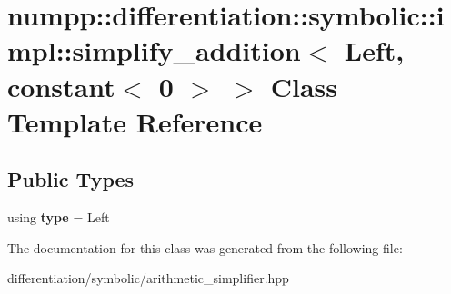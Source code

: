 \hypertarget{classnumpp_1_1differentiation_1_1symbolic_1_1impl_1_1simplify__addition_3_01Left_00_01constant_3_010_01_4_01_4}{}\section{numpp\+:\+:differentiation\+:\+:symbolic\+:\+:impl\+:\+:simplify\+\_\+addition$<$ Left, constant$<$ 0 $>$ $>$ Class Template Reference}
\label{classnumpp_1_1differentiation_1_1symbolic_1_1impl_1_1simplify__addition_3_01Left_00_01constant_3_010_01_4_01_4}
\subsection*{Public Types}
\begin{DoxyCompactItemize}
\item 
\mbox{\label{classnumpp_1_1differentiation_1_1symbolic_1_1impl_1_1simplify__addition_3_01Left_00_01constant_3_010_01_4_01_4_a088c52e65597589bcababd58c815417f}} 
using {\bfseries type} = Left
\end{DoxyCompactItemize}


The documentation for this class was generated from the following file\+:\begin{DoxyCompactItemize}
\item 
differentiation/symbolic/arithmetic\+\_\+simplifier.\+hpp\end{DoxyCompactItemize}
